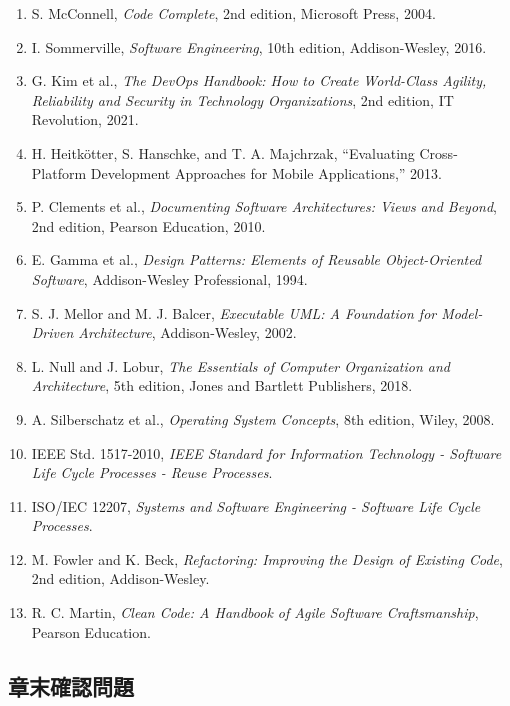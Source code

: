 \documentclass[a4paper,11pt]{ltjsarticle}
\numberwithin{figure}{section}
\numberwithin{table}{section}
\begin{document}
\begin{enumerate}
  \item S. McConnell, \textit{Code Complete}, 2nd edition, Microsoft Press, 2004.
  \item I. Sommerville, \textit{Software Engineering}, 10th edition, Addison-Wesley, 2016.
  \item G. Kim et al., \textit{The DevOps Handbook: How to Create World-Class Agility, Reliability and Security in Technology Organizations}, 2nd edition, IT Revolution, 2021.
  \item H. Heitkötter, S. Hanschke, and T. A. Majchrzak, ``Evaluating Cross-Platform Development Approaches for Mobile Applications,'' 2013.
  \item P. Clements et al., \textit{Documenting Software Architectures: Views and Beyond}, 2nd edition, Pearson Education, 2010.
  \item E. Gamma et al., \textit{Design Patterns: Elements of Reusable Object-Oriented Software}, Addison-Wesley Professional, 1994.
  \item S. J. Mellor and M. J. Balcer, \textit{Executable UML: A Foundation for Model-Driven Architecture}, Addison-Wesley, 2002.
  \item L. Null and J. Lobur, \textit{The Essentials of Computer Organization and Architecture}, 5th edition, Jones and Bartlett Publishers, 2018.
  \item A. Silberschatz et al., \textit{Operating System Concepts}, 8th edition, Wiley, 2008.
  \item IEEE Std. 1517-2010, \textit{IEEE Standard for Information Technology - Software Life Cycle Processes - Reuse Processes}.
  \item ISO/IEC 12207, \textit{Systems and Software Engineering - Software Life Cycle Processes}.
  \item M. Fowler and K. Beck, \textit{Refactoring: Improving the Design of Existing Code}, 2nd edition, Addison-Wesley.
  \item R. C. Martin, \textit{Clean Code: A Handbook of Agile Software Craftsmanship}, Pearson Education.
\end{enumerate}

\subsection{章末確認問題}
\end{document}
